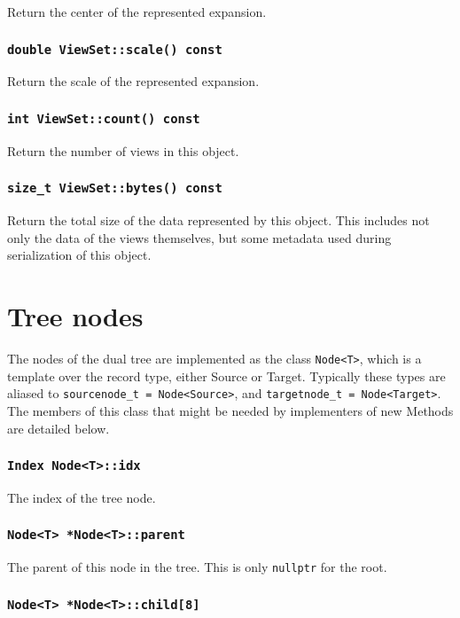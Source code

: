Return the center of the represented expansion.

\subsubsection{\texttt{double ViewSet::scale() const}}

Return the scale of the represented expansion.

\subsubsection{\texttt{int ViewSet::count() const}}

Return the number of views in this object.

\subsubsection{\texttt{size\_t ViewSet::bytes() const}}

Return the total size of the data represented by this object. This includes
not only the data of the views themselves, but some metadata used during
serialization of this object.


\section{Tree nodes}

The nodes of the dual tree are implemented as the class \texttt{Node<T>}, which
is a template over the record type, either Source or Target. Typically these
types are aliased to \texttt{sourcenode\_t = Node<Source>}, and
\texttt{targetnode\_t = Node<Target>}. The members of this class that might be
needed by implementers of new Methods are detailed below.

\subsubsection{\texttt{Index Node<T>::idx}}

The index of the tree node.

\subsubsection{\texttt{Node<T> *Node<T>::parent}}

The parent of this node in the tree. This is only \texttt{nullptr} for
the root.

\subsubsection{\texttt{Node<T> *Node<T>::child[8]}}

